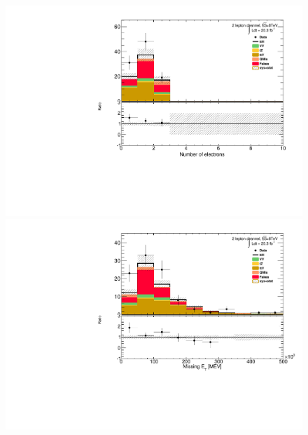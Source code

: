 \begin{figure}[!htbp]
\begin{minipage}[h]{0.5\textwidth}
  \end{minipage}\hfill
  \begin{minipage}[h]{0.5\textwidth}
    \centering \includegraphics[width=\textwidth]{figs/results/plotCand_2lep_NElec}
  \end{minipage}\hfill
  \begin{minipage}[h]{0.5\textwidth}
    \centering \includegraphics[width=\textwidth]{figs/results/plotCand_2lep_MET}
  \end{minipage}\hfill
  \begin{minipage}[h]{0.5\textwidth}

\end{minipage}
\end{figure}
